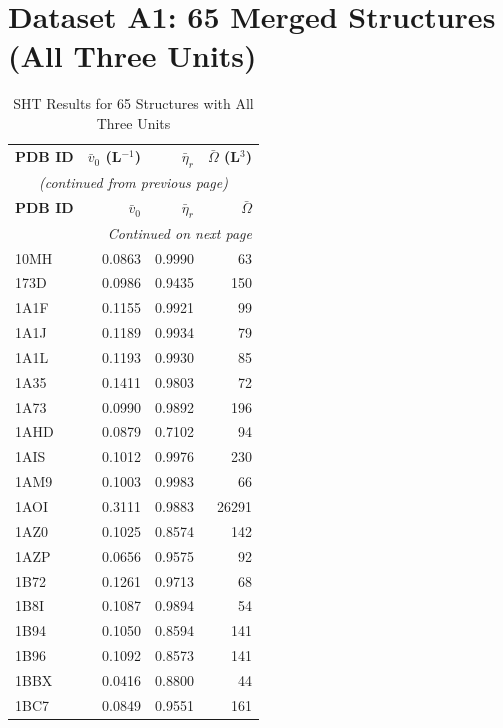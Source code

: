 \section{Dataset A1: 65 Merged Structures (All Three Units)}

\begin{longtable}{lrrr}
    \caption{SHT Results for 65 Structures with All Three Units}{dataset_merged} \\
    \toprule
    \textbf{PDB ID} & \textbf{$\bar{v}_0$ (L$^{-1}$)} & \textbf{$\bar{\eta}_r$} & \textbf{$\bar{\Omega}$ (L$^3$)} \\
    \midrule
    \endfirsthead
    \multicolumn{4}{c}{{\textit{(continued from previous page)}}} \\
    \toprule
    \textbf{PDB ID} & \textbf{$\bar{v}_0$} & \textbf{$\bar{\eta}_r$} & \textbf{$\bar{\Omega}$} \\
    \midrule
    \endhead
    \midrule
    \multicolumn{4}{r}{{\textit{Continued on next page}}} \\
    \endfoot
    \bottomrule
    \endlastfoot
        10MH & 0.0863 & 0.9990 & 63 \\
        173D & 0.0986 & 0.9435 & 150 \\
        1A1F & 0.1155 & 0.9921 & 99 \\
        1A1J & 0.1189 & 0.9934 & 79 \\
        1A1L & 0.1193 & 0.9930 & 85 \\
        1A35 & 0.1411 & 0.9803 & 72 \\
        1A73 & 0.0990 & 0.9892 & 196 \\
        1AHD & 0.0879 & 0.7102 & 94 \\
        1AIS & 0.1012 & 0.9976 & 230 \\
        1AM9 & 0.1003 & 0.9983 & 66 \\
        1AOI & 0.3111 & 0.9883 & 26291 \\
        1AZ0 & 0.1025 & 0.8574 & 142 \\
        1AZP & 0.0656 & 0.9575 & 92 \\
        1B72 & 0.1261 & 0.9713 & 68 \\
        1B8I & 0.1087 & 0.9894 & 54 \\
        1B94 & 0.1050 & 0.8594 & 141 \\
        1B96 & 0.1092 & 0.8573 & 141 \\
        1BBX & 0.0416 & 0.8800 & 44 \\
        1BC7 & 0.0849 & 0.9551 & 161 \\

\end{longtable}
